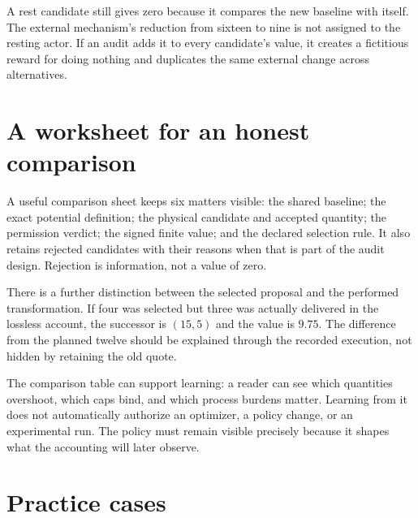 A rest candidate still gives zero because it compares the new baseline with itself. The external mechanism's reduction from sixteen to nine is not assigned to the resting actor. If an audit adds it to every candidate's value, it creates a fictitious reward for doing nothing and duplicates the same external change across alternatives.

\section{A worksheet for an honest comparison}

A useful comparison sheet keeps six matters visible: the shared baseline; the exact potential definition; the physical candidate and accepted quantity; the permission verdict; the signed finite value; and the declared selection rule. It also retains rejected candidates with their reasons when that is part of the audit design. Rejection is information, not a value of zero.

There is a further distinction between the selected proposal and the performed transformation. If four was selected but three was actually delivered in the lossless account, the successor is \((15,5)\) and the value is \(9.75\). The difference from the planned twelve should be explained through the recorded execution, not hidden by retaining the old quote.

The comparison table can support learning: a reader can see which quantities overshoot, which caps bind, and which process burdens matter. Learning from it does not automatically authorize an optimizer, a policy change, or an experimental run. The policy must remain visible precisely because it shapes what the accounting will later observe.

\section{Practice cases}

